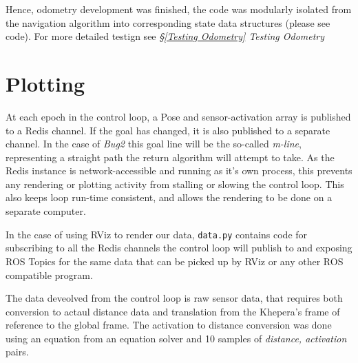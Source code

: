 \documentclass[11pt, a4paper]{article}
\begin{document}
Hence, odometry development was finished, the code was modularly isolated from the navigation algorithm 
into corresponding state data structures (please see code). For more detailed testign see 
\textit{\S\ref{Testing Odometry} Testing Odometry}



\newpage
\section{Plotting}
\label{Plotting}

At each epoch in the control loop, a Pose and sensor-activation array is published to a Redis channel.
If the goal has changed, it is also published to a separate channel. 
In the case of \textit{Bug2} this goal line will be the so-called \textit{m-line}, representing a 
straight path the return algorithm will attempt to take. As the Redis instance is network-accessible 
and running as it's own process, this prevents any rendering or plotting activity from stalling or 
slowing the control loop. This also keeps loop run-time consistent, and allows the rendering to
be done on a separate computer.

In the case of using RViz to render our data, \texttt{data.py} contains code for 
subscribing to all the Redis channels the control loop will publish to and exposing 
ROS Topics for the same data that can be picked up by RViz or any other ROS compatible 
program.

The data deveolved from the control loop is raw sensor data, that requires both conversion to
actaul distance data and translation from the Khepera's frame of reference to the global frame.
The activation to distance conversion was done using an equation from an equation solver and 10
samples of \textit{distance, activation} pairs.
\end{document}
